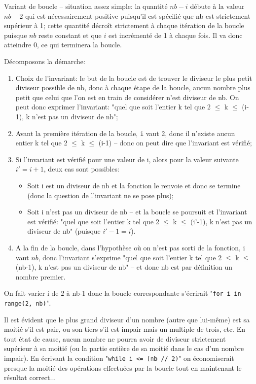 \documentclass[12pt]{article}
\begin{document}
	\begin{MaReponse}
		\begin{alphenum}
			\item Variant de boucle -- situation assez simple: la quantité $nb - i$ débute à la valeur $nb - 2$ qui est nécessairement positive puisqu'il est spécifié que nb est strictement supérieur à 1; cette quantité décroît strictement à chaque itération de la boucle puisque $nb$ reste constant et que $i$ est incrémenté de 1 à chaque fois. Il va donc atteindre 0, ce qui terminera la boucle.
			\item Décomposons la démarche:
			\begin{enumerate}
				\item Choix de l'invariant: le but de la boucle est de trouver le diviseur le plus petit diviseur possible de nb, donc à chaque étape de la boucle, aucun nombre plus petit que celui que l'on est en train de considérer n'est diviseur de nb. On peut donc exprimer l'invariant: "quel que soit l'entier k tel que 2 $\leq$ k $\leq$ (i-1), k n'est pas un diviseur de nb";
				\item Avant la première itération de la boucle, \texttt{i} vaut 2, donc il n'existe aucun entier k tel que 2 $\leq$ k $\leq$ (i-1) -- donc on peut dire que l'invariant est vérifié;
				\item Si l'invariant est vérifié pour une valeur de i, alors pour la valeur suivante $i' = i + 1$, deux cas sont possibles:
				\begin{itemize}
					\item Soit i est un diviseur de nb et la fonction le renvoie et donc se termine (donc la question de l'invariant ne se pose plus);
					\item Soit i n'est pas un diviseur de nb -- et la boucle se poursuit et l'invariant est vérifié: "quel que soit l'entier k tel que 2 $\leq$ k $\leq$ (i'-1), k n'est pas un diviseur de nb" (puisque $i'-1 = i$).
				\end{itemize}
				\item A la fin de la boucle, dans l'hypothèse où on n'est pas sorti de la fonction, i vaut $nb$, donc l'invariant s'exprime "quel que soit l'entier k tel que 2 $\leq$ k $\leq$ (nb-1), k n'est pas un diviseur de nb" -- et donc nb est par définition un nombre premier.
			\end{enumerate}
			\item On fait varier i de 2 à nb-1 donc la boucle correspondante s'écrirait "\texttt{for i in range(2, nb)}".
			\item Il est évident que le plus grand diviseur d'un nombre (autre que lui-même) est sa moitié s'il est pair, ou son tiers s'il est impair mais un multiple de trois, etc. En tout état de cause, aucun nombre ne pourra avoir de diviseur strictement supérieur à sa moitié (ou la partie entière de sa moitié dans le cas d'un nombre impair). En écrivant la condition "\texttt{while i <= (nb // 2)}" on économiserait presque la moitié des opérations effectuées par la boucle tout en maintenant le résultat correct...
		\end{alphenum}
	\end{MaReponse}
	
\end{document}
